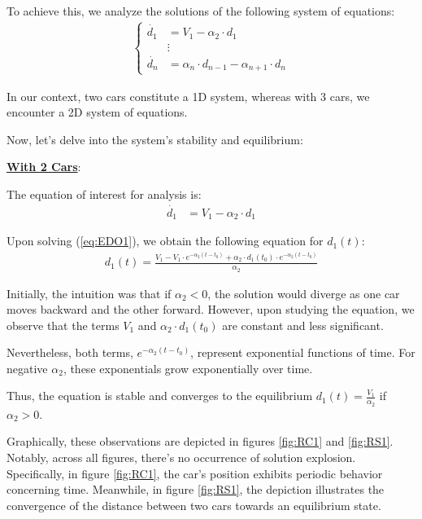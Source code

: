 \documentclass{article}
\begin{document}
		To achieve this, we analyze the solutions of the following system of equations:
		\begin{align*}
			\begin{cases}
				\dot{d_1} &= V_1 - \alpha_2 \cdot d_1 \\
				&\vdots \\
				\dot{d_n} &= \alpha_n \cdot d_{n-1} - \alpha_{n+1} \cdot d_n
			\end{cases}
		\end{align*}
		
		In our context, two cars constitute a 1D system, whereas with 3 cars, we encounter a 2D system of equations.
		
		Now, let's delve into the system's stability and equilibrium:
		
		\textbf{\underline{With 2 Cars}}:
		
		The equation of interest for analysis is:
		\begin{align*}
			\dot{d_1} &= V_1 - \alpha_2 \cdot d_1
		\end{align*}
		
		Upon solving (\ref{eq:EDO1}), we obtain the following equation for \(d_1(t)\):
		\begin{align*}
			\boxed{d_1(t) = \frac{{V_1 - V_1 \cdot e^{-\alpha_2(t-t_0)} + \alpha_2 \cdot d_1(t_0) \cdot e^{-\alpha_2(t-t_0)}}}{\alpha_2}}
		\end{align*}
		
		Initially, the intuition was that if \(\alpha_2 < 0\), the solution would diverge as one car moves backward and the other forward. However, upon studying the equation, we observe that the terms \(V_1\) and \(\alpha_2 \cdot d_1(t_0)\) are constant and less significant.
		
		Nevertheless, both terms, \(e^{-\alpha_2(t-t_0)}\), represent exponential functions of time. For negative \(\alpha_2\), these exponentials grow exponentially over time.
		
		Thus, the equation is stable and converges to the equilibrium \(\boxed{d_1(t)=\frac{V_1}{\alpha_2}}\) if \(\alpha_2 > 0\).
		
		Graphically, these observations are depicted in figures \ref{fig:RC1} and \ref{fig:RS1}. Notably, across all figures, there's no occurrence of solution explosion. Specifically, in figure \ref{fig:RC1}, the car's position exhibits periodic behavior concerning time. Meanwhile, in figure \ref{fig:RS1}, the depiction illustrates the convergence of the distance between two cars towards an equilibrium state.
		
\end{document}

